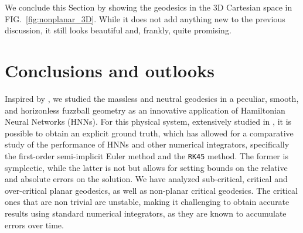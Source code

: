 \documentclass[prd,aps,a4paper,eqsecnum,nofootinbib,floatfix,twocolumn,superscriptaddress]{revtex4-2}
\begin{document}
We conclude this Section by showing the geodesics in the 3D Cartesian space in FIG.~\ref{fig:nonplanar_3D}. While it does not add anything new to the previous discussion, it  still looks beautiful and, frankly, quite promising.



 
 
\section{\label{conclusions}Conclusions and outlooks}

Inspired by \cite{Harvard}, we studied the massless and neutral geodesics in a peculiar, smooth, and horizonless fuzzball geometry as an innovative application of Hamiltonian Neural Networks (HNNs). For this physical system, extensively studied in \cite{Bianchi:2017sds, Bianchi:2022qph, DiRusso:2024hmd}, it is possible to obtain an explicit ground truth, which has allowed for a comparative study of the performance of HNNs and other numerical integrators, specifically the first-order semi-implicit Euler method and the \texttt{RK45} method. The former is symplectic, while the latter is not but allows for setting bounds on the relative and absolute errors on the solution. We have analyzed sub-critical, critical and over-critical planar geodesics, as well as non-planar critical geodesics. The critical ones that are non trivial are unstable, making it challenging to obtain accurate results using standard numerical integrators, as they are known to accumulate errors over time.
\end{document}

